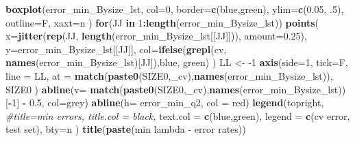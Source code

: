 \documentclass[
]{book}
\newenvironment{Shaded}{\begin{snugshade}}{\end{snugshade}}
\newcommand{\CommentTok}[1]{\textcolor[rgb]{0.56,0.35,0.01}{\textit{#1}}}
\newcommand{\ControlFlowTok}[1]{\textcolor[rgb]{0.13,0.29,0.53}{\textbf{#1}}}
\newcommand{\DataTypeTok}[1]{\textcolor[rgb]{0.13,0.29,0.53}{#1}}
\newcommand{\DecValTok}[1]{\textcolor[rgb]{0.00,0.00,0.81}{#1}}
\newcommand{\FloatTok}[1]{\textcolor[rgb]{0.00,0.00,0.81}{#1}}
\newcommand{\KeywordTok}[1]{\textcolor[rgb]{0.13,0.29,0.53}{\textbf{#1}}}
\newcommand{\NormalTok}[1]{#1}
\newcommand{\OperatorTok}[1]{\textcolor[rgb]{0.81,0.36,0.00}{\textbf{#1}}}
\newcommand{\StringTok}[1]{\textcolor[rgb]{0.31,0.60,0.02}{#1}}
\begin{document}
\begin{Shaded}
\begin{Highlighting}[]
\KeywordTok{boxplot}\NormalTok{(error\_min\_Bysize\_lst,}
  \DataTypeTok{col=}\DecValTok{0}\NormalTok{,}
  \DataTypeTok{border=}\KeywordTok{c}\NormalTok{(}\StringTok{\textquotesingle{}blue\textquotesingle{}}\NormalTok{,}\StringTok{\textquotesingle{}green\textquotesingle{}}\NormalTok{),}
  \DataTypeTok{ylim=}\KeywordTok{c}\NormalTok{(}\FloatTok{0.05}\NormalTok{, }\FloatTok{.5}\NormalTok{),}
  \DataTypeTok{outline=}\NormalTok{F,}
  \DataTypeTok{xaxt=}\StringTok{\textquotesingle{}n\textquotesingle{}}
\NormalTok{)}
\ControlFlowTok{for}\NormalTok{(JJ }\ControlFlowTok{in} \DecValTok{1}\OperatorTok{:}\KeywordTok{length}\NormalTok{(error\_min\_Bysize\_lst))}
\KeywordTok{points}\NormalTok{(}
   \DataTypeTok{x=}\KeywordTok{jitter}\NormalTok{(}\KeywordTok{rep}\NormalTok{(JJ, }\KeywordTok{length}\NormalTok{(error\_min\_Bysize\_lst[[JJ]])), }\DataTypeTok{amount=}\FloatTok{0.25}\NormalTok{), }
   \DataTypeTok{y=}\NormalTok{error\_min\_Bysize\_lst[[JJ]],}
   \DataTypeTok{col=}\KeywordTok{ifelse}\NormalTok{(}\KeywordTok{grepl}\NormalTok{(}\StringTok{\textquotesingle{}cv\textquotesingle{}}\NormalTok{, }\KeywordTok{names}\NormalTok{(error\_min\_Bysize\_lst)[JJ]),}\StringTok{\textquotesingle{}blue\textquotesingle{}}\NormalTok{, }\StringTok{\textquotesingle{}green\textquotesingle{}}\NormalTok{)}
\NormalTok{)}
\NormalTok{LL <{-}}\StringTok{ }\DecValTok{{-}1}
\KeywordTok{axis}\NormalTok{(}\DataTypeTok{side=}\DecValTok{1}\NormalTok{, }\DataTypeTok{tick=}\NormalTok{F, }\DataTypeTok{line =}\NormalTok{ LL,}
  \DataTypeTok{at =} \KeywordTok{match}\NormalTok{(}\KeywordTok{paste0}\NormalTok{(SIZE0,}\StringTok{\textquotesingle{}\_cv\textquotesingle{}}\NormalTok{),}\KeywordTok{names}\NormalTok{(error\_min\_Bysize\_lst)),}
\NormalTok{  SIZE0}
\NormalTok{ )}
\KeywordTok{abline}\NormalTok{(}\DataTypeTok{v=} \KeywordTok{match}\NormalTok{(}\KeywordTok{paste0}\NormalTok{(SIZE0,}\StringTok{\textquotesingle{}\_cv\textquotesingle{}}\NormalTok{),}\KeywordTok{names}\NormalTok{(error\_min\_Bysize\_lst))[}\OperatorTok{{-}}\DecValTok{1}\NormalTok{] }\OperatorTok{{-}}\StringTok{ }\FloatTok{0.5}\NormalTok{, }\DataTypeTok{col=}\StringTok{\textquotesingle{}grey\textquotesingle{}}\NormalTok{)}
\KeywordTok{abline}\NormalTok{(}\DataTypeTok{h=}\NormalTok{ error\_min\_q2, }\DataTypeTok{col =} \StringTok{\textquotesingle{}red\textquotesingle{}}\NormalTok{)}
\KeywordTok{legend}\NormalTok{(}\StringTok{\textquotesingle{}topright\textquotesingle{}}\NormalTok{,}
   \CommentTok{\#title=\textquotesingle{}min errors\textquotesingle{}, title.col = \textquotesingle{}black\textquotesingle{},}
   \DataTypeTok{text.col =} \KeywordTok{c}\NormalTok{(}\StringTok{\textquotesingle{}blue\textquotesingle{}}\NormalTok{,}\StringTok{\textquotesingle{}green\textquotesingle{}}\NormalTok{),}
   \DataTypeTok{legend =} \KeywordTok{c}\NormalTok{(}\StringTok{\textquotesingle{}cv error\textquotesingle{}}\NormalTok{, }\StringTok{\textquotesingle{}test set\textquotesingle{}}\NormalTok{),}
   \DataTypeTok{bty=}\StringTok{\textquotesingle{}n\textquotesingle{}}
\NormalTok{ )}
\KeywordTok{title}\NormalTok{(}\KeywordTok{paste}\NormalTok{(}\StringTok{\textquotesingle{}min lambda {-} error rates\textquotesingle{}}\NormalTok{))}



\end{Highlighting}
\end{Shaded}
\end{document}
